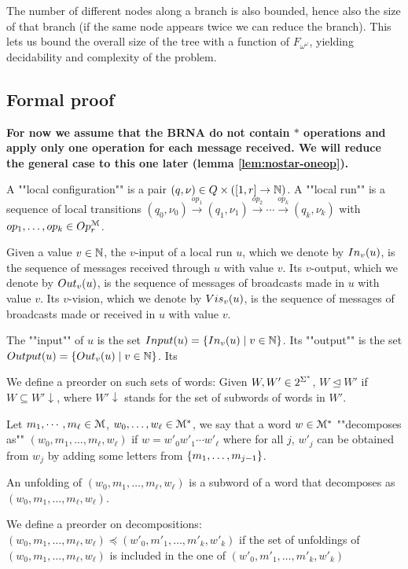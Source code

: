 The number of different nodes along a branch is also bounded, hence also the size of that branch (if the same node appears twice we can reduce the branch).
 This lets us bound the overall size of the tree with a function of $F_{\omega^\omega}$, yielding decidability and complexity of the problem.

\subsection{Formal proof}

\textbf{For now we assume that the BRNA do not contain $*$ operations and apply only one operation for each message received. We will reduce the general case to this one later (lemma \ref{lem:nostar-oneop}).}

\begin{definition}
	A ""local configuration"" is a pair $(q, \nu) \in Q \times ([1,r] \to \mathbb{N})$.
	A ""local run"" is a sequence of local transitions $(q_0, \nu_0) \xrightarrow{op_1} (q_1, \nu_1) \xrightarrow{op_2} \cdots \xrightarrow{op_k} (q_k, \nu_k)$ with $op_1, \ldots, op_k \in Op_r^{\mathcal{M}}$.
	
	Given a value $v \in \mathbb{N}$, the $v$-input of a local run $u$, which we denote by $In_{v}(u)$, is the sequence of messages received through $u$ with value $v$.
	Its $v$-output, which we denote by $Out_{v}(u)$, is the sequence of messages of broadcasts made in $u$ with value $v$. 
	Its $v$-vision, which we denote by $Vis_{v}(u)$, is the sequence of messages of broadcasts made or received in $u$ with value $v$.
	
	The ""input"" of $u$ is the set $Input(u) = \{In_{v}(u) \mid v \in \mathbb{N}\}$.
	Its ""output"" is the set $Output(u)=\{Out_{v}(u) \mid v \in \mathbb{N}\}$. Its 
	
	We define a preorder on such sets of words:
	Given $W, W' \in 2^{\Sigma^*}$, $W \unlhd W'$ if $W \subseteq W'\downarrow$, where $W'\downarrow$ stands for the set of subwords of words in $W'$.
\end{definition}



\begin{definition}
	Let $m_1, \cdots, m_\ell \in \mathcal{M}$, $w_0, \ldots, w_\ell \in \mathcal{M}^*$, we say that a word $w \in \mathcal{M}^*$ ""decomposes as"" $(w_0, m_1, \ldots, m_\ell, w_\ell)$ if $w = w'_0 w'_1 \cdots w'_\ell$ where for all $j$, $w'_j$ can be obtained from $w_j$ by adding some letters from $\{m_1, \ldots, m_{j-1}\}$.
	
	An unfolding of $(w_0, m_1, \ldots, m_\ell, w_\ell)$ is a subword of a word that decomposes as $(w_0, m_1, \ldots, m_\ell, w_\ell)$. 
	
	We define a preorder on decompositions:
	$(w_0, m_1, \ldots, m_\ell, w_\ell) \preceq (w'_0, m'_1, \ldots, m'_k, w'_k)$ if the set of unfoldings of $(w_0, m_1, \ldots, m_\ell, w_\ell)$ is included in the one of $(w'_0, m'_1, \ldots, m'_k, w'_k)$
\end{definition}

